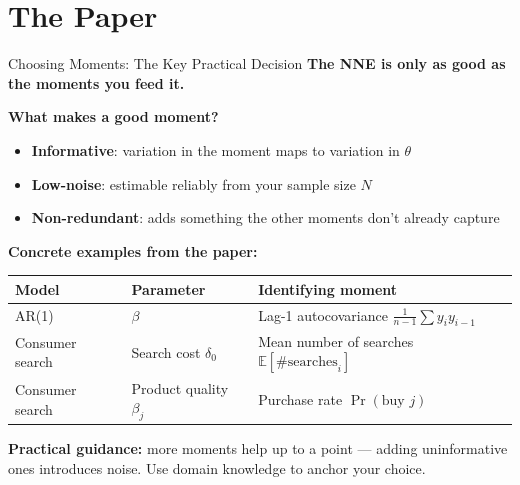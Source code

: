 \documentclass[aspectratio=169,professionalfonts]{beamer}
\newcommand{\hl}[1]{\textbf{\textcolor{UGARed}{#1}}}
\begin{document}
\section{The Paper}

\begin{frame}{Choosing Moments: The Key Practical Decision}
  \hl{The NNE is only as good as the moments you feed it.}
  \medskip

  \hl{What makes a good moment?}
  \begin{itemize}
    \item \textbf{Informative}: variation in the moment maps to variation in $\theta$
    \item \textbf{Low-noise}: estimable reliably from your sample size $N$
    \item \textbf{Non-redundant}: adds something the other moments don't already capture
  \end{itemize}
  \medskip

  \hl{Concrete examples from the paper:}
  \begin{center}
  \begin{tabular}{lll}
    \toprule
    \textbf{Model} & \textbf{Parameter} & \textbf{Identifying moment} \\
    \midrule
    AR(1)           & $\beta$           & Lag-1 autocovariance $\frac{1}{n-1}\sum y_i y_{i-1}$ \\
    Consumer search & Search cost $\delta_0$ & Mean number of searches $\mathbb{E}[\text{\# searches}_i]$ \\
    Consumer search & Product quality $\beta_j$ & Purchase rate $\Pr(\text{buy } j)$ \\
    \bottomrule
  \end{tabular}
  \end{center}
  \medskip

  \smallskip
  \hl{Practical guidance:} more moments help up to a point --- adding uninformative ones introduces noise. Use domain knowledge to anchor your choice.
\end{frame}
\end{document}
